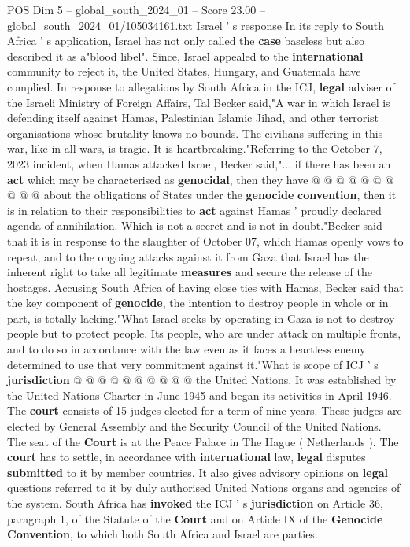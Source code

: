 \begin{textsample}{POS Dim 5 – global\_south\_2024\_01 – Score 23.00 – global\_south\_2024\_01/105034161.txt}
Israel ' s response In its reply to South Africa ' s application, Israel has not only called the \textbf{case} baseless but also described it as a"blood libel".
Since, Israel appealed to the \textbf{international} community to reject it, the United States, Hungary, and Guatemala have complied.
In response to allegations by South Africa in the ICJ, \textbf{legal} adviser of the Israeli Ministry of Foreign Affairs, Tal Becker said,"A war in which Israel is defending itself against Hamas, Palestinian Islamic Jihad, and other terrorist organisations whose brutality knows no bounds.
The civilians suffering in this war, like in all wars, is tragic.
It is heartbreaking."Referring to the October 7, 2023 incident, when Hamas attacked Israel, Becker said,"... if there has been an \textbf{act} which may be characterised as \textbf{genocidal}, then they have @ @ @ @ @ @ @ @ @ @ about the obligations of States under the \textbf{genocide} \textbf{convention}, then it is in relation to their responsibilities to \textbf{act} against Hamas ' proudly declared agenda of annihilation.
Which is not a secret and is not in doubt."Becker said that it is in response to the slaughter of October 07, which Hamas openly vows to repeat, and to the ongoing attacks against it from Gaza that Israel has the inherent right to take all legitimate \textbf{measures} and secure the release of the hostages.
Accusing South Africa of having close ties with Hamas, Becker said that the key component of \textbf{genocide}, the intention to destroy people in whole or in part, is totally lacking."What Israel seeks by operating in Gaza is not to destroy people but to protect people.
Its people, who are under attack on multiple fronts, and to do so in accordance with the law even as it faces a heartless enemy determined to use that very commitment against it."What is scope of ICJ ' s \textbf{jurisdiction} @ @ @ @ @ @ @ @ @ @ the United Nations.
It was established by the United Nations Charter in June 1945 and began its activities in April 1946.
The \textbf{court} consists of 15 judges elected for a term of nine-years.
These judges are elected by General Assembly and the Security Council of the United Nations.
The seat of the \textbf{Court} is at the Peace Palace in The Hague ( Netherlands ).
The \textbf{court} has to settle, in accordance with \textbf{international} law, \textbf{legal} disputes \textbf{submitted} to it by member countries.
It also gives advisory opinions on \textbf{legal} questions referred to it by duly authorised United Nations organs and agencies of the system.
South Africa has \textbf{invoked} the ICJ ' s \textbf{jurisdiction} on Article 36, paragraph 1, of the Statute of the \textbf{Court} and on Article IX of the \textbf{Genocide} \textbf{Convention}, to which both South Africa and Israel are parties.

\end{textsample}
